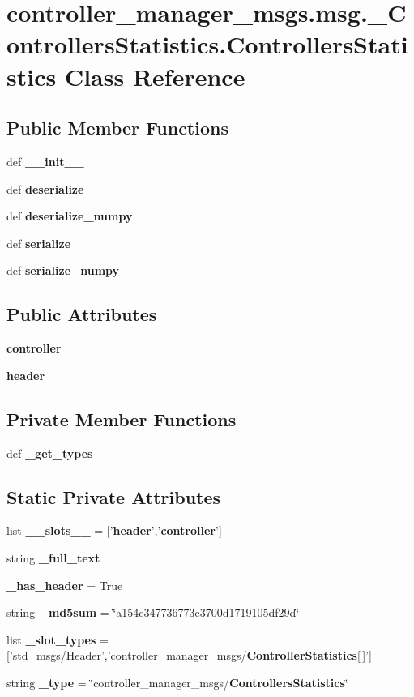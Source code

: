 \section{controller\-\_\-manager\-\_\-msgs.\-msg.\-\_\-\-Controllers\-Statistics.\-Controllers\-Statistics \-Class \-Reference}
\label{classcontroller__manager__msgs_1_1msg_1_1__ControllersStatistics_1_1ControllersStatistics}
\subsection*{\-Public \-Member \-Functions}
\begin{DoxyCompactItemize}
\item 
def {\bf \-\_\-\-\_\-init\-\_\-\-\_\-}
\item 
def {\bf deserialize}
\item 
def {\bf deserialize\-\_\-numpy}
\item 
def {\bf serialize}
\item 
def {\bf serialize\-\_\-numpy}
\end{DoxyCompactItemize}
\subsection*{\-Public \-Attributes}
\begin{DoxyCompactItemize}
\item 
{\bf controller}
\item 
{\bf header}
\end{DoxyCompactItemize}
\subsection*{\-Private \-Member \-Functions}
\begin{DoxyCompactItemize}
\item 
def {\bf \-\_\-get\-\_\-types}
\end{DoxyCompactItemize}
\subsection*{\-Static \-Private \-Attributes}
\begin{DoxyCompactItemize}
\item 
list {\bf \-\_\-\-\_\-slots\-\_\-\-\_\-} = ['{\bf header}','{\bf controller}']
\item 
string {\bf \-\_\-full\-\_\-text}
\item 
{\bf \-\_\-has\-\_\-header} = \-True
\item 
string {\bf \-\_\-md5sum} = \char`\"{}a154c347736773e3700d1719105df29d\char`\"{}
\item 
list {\bf \-\_\-slot\-\_\-types} = ['std\-\_\-msgs/\-Header','controller\-\_\-manager\-\_\-msgs/{\bf \-Controller\-Statistics}[$\,$]']
\item 
string {\bf \-\_\-type} = \char`\"{}controller\-\_\-manager\-\_\-msgs/{\bf \-Controllers\-Statistics}\char`\"{}
\end{DoxyCompactItemize}



